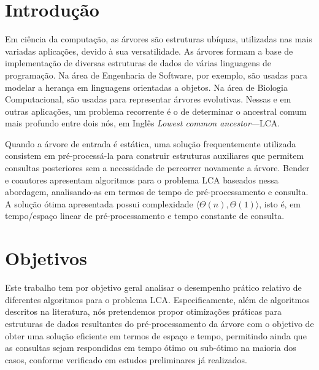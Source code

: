 \documentclass[12pt, a4paper, oneside]{article}
\begin{document}
\clearpage
\setcounter{page}{1}
\section*{Introdução}

Em ciência da computação, as árvores são estruturas ubíquas, utilizadas nas mais variadas aplicações, devido à sua versatilidade. As árvores formam a base de implementação de diversas estruturas de dados de várias linguagens de programação. Na área de Engenharia de Software, por exemplo, são usadas para modelar a herança em linguagens orientadas a objetos. Na área de Biologia Computacional, são usadas para representar árvores evolutivas. Nessas e em outras aplicações, um problema recorrente é o de determinar o ancestral comum mais profundo entre dois nós, em Inglês \textit{Lowest common ancestor}---LCA. 

Quando a árvore de entrada é estática, uma solução frequentemente utilizada consistem em pré-processá-la para construir estruturas auxiliares que permitem consultas posteriores sem a necessidade de percorrer novamente a árvore. Bender e coautores \cite{Bender2005} apresentam algoritmos para o problema LCA baseados nessa abordagem, analisando-as em termos de tempo de pré-processamento e consulta. A solução ótima apresentada possui complexidade $\langle \Theta(n), \Theta(1)\rangle$, isto é, em tempo/espaço linear de pré-processamento e tempo constante de consulta.


\section*{Objetivos}


Este trabalho tem por objetivo geral analisar o desempenho prático relativo de diferentes algoritmos para o problema LCA. Especificamente, além de algoritmos descritos na literatura, nós pretendemos propor otimizações práticas para estruturas de dados resultantes do  pré-processamento da árvore com o objetivo de obter uma solução eficiente em termos de espaço e tempo, permitindo ainda que as consultas sejam respondidas em tempo ótimo ou sub-ótimo na maioria dos casos, conforme verificado em estudos preliminares já realizados.
\end{document}
